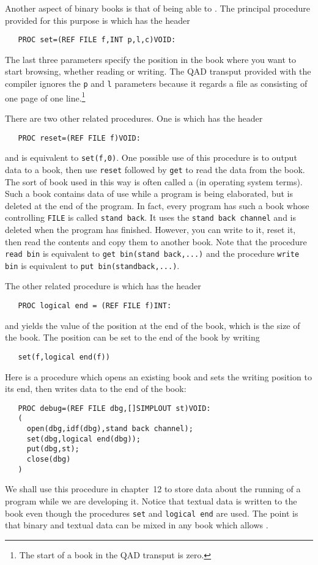 Another aspect of binary books is that of being able to
. The principal procedure provided for this
purpose is  which has the header
\begin{verbatim}
   PROC set=(REF FILE f,INT p,l,c)VOID:
\end{verbatim}
\noindent
The last three parameters specify the position in the book where you
want to start browsing, whether reading or writing. The QAD transput
provided with the  compiler
ignores the \verb|p| and \verb|l| parameters because it regards a
file as consisting of one page of one line.\footnote{The start of a
book in the QAD transput is zero.}

There are two other related procedures.  One is
 which has the header
\begin{verbatim}
   PROC reset=(REF FILE f)VOID:
\end{verbatim}
\noindent
and is equivalent to \verb|set(f,0)|. One possible use of this
procedure is to output data to a book, then use \verb|reset| followed
by \verb|get| to read the data from the book. The sort of book used
in this way is often called a  (in operating system
terms). Such a book contains data of use while a program is being
elaborated, but is deleted at the end of the program.  In fact, every
program has such a book whose controlling \verb|FILE| is called
\verb|stand back|. It uses the \verb|stand back channel| and is
deleted when the program has finished. However, you can write to it,
reset it, then read the contents and copy them to another book.  Note
that the procedure \verb|read bin| is equivalent to
\verb|get bin(stand back,...)| and the procedure \verb|write bin| is
equivalent to \verb|put bin(standback,...)|.

The other related procedure is  which has the header
\begin{verbatim}
   PROC logical end = (REF FILE f)INT:
\end{verbatim}
\noindent
and yields the value of the position at the end of the book, which is
the size of the book. The position can be set to the end of the book by
writing
\begin{verbatim}
   set(f,logical end(f))
\end{verbatim}
\noindent
Here is a procedure which opens an existing book and sets the writing
position to its end, then writes data to the end of the book:
\begin{verbatim}
   PROC debug=(REF FILE dbg,[]SIMPLOUT st)VOID:
   (
     open(dbg,idf(dbg),stand back channel);
     set(dbg,logical end(dbg));
     put(dbg,st);
     close(dbg)
   )
\end{verbatim}
\noindent
We shall use this procedure in chapter~12 to store data about the
running of a program while we are developing it. Notice that textual
data is written to the book even though the procedures \verb|set| and
\verb|logical end| are used.  The point is that binary and textual
data can be mixed in any book which allows .

